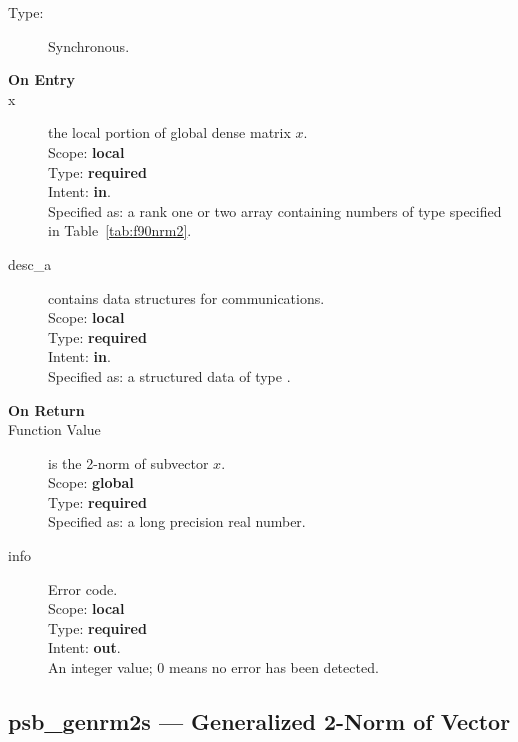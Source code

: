 \begin{description}
\item[Type:] Synchronous.
\item[\bf On Entry]
\item[x] the local portion of global dense matrix
$x$.%
\\
Scope: {\bf local} \\
Type: {\bf required} \\
Intent: {\bf in}.\\
Specified as:  a rank one or two array 
containing numbers of type specified in
Table~\ref{tab:f90nrm2}.
\item[desc\_a] contains data structures for communications.\\
Scope: {\bf local} \\
Type: {\bf required}\\
Intent: {\bf in}.\\
Specified as: a structured data of type \descdata.

\item[\bf On Return] 
\item[Function Value] is the 2-norm of subvector $x$.\\
Scope: {\bf global} \\
Type: {\bf required} \\
Specified as: a long precision real number.
\item[info] Error code.\\
Scope: {\bf local} \\
Type: {\bf required} \\
Intent: {\bf out}.\\
An integer value; 0 means no error has been detected. 
\end{description}



\clearpage\subsection*{psb\_genrm2s --- Generalized 2-Norm of Vector}    

